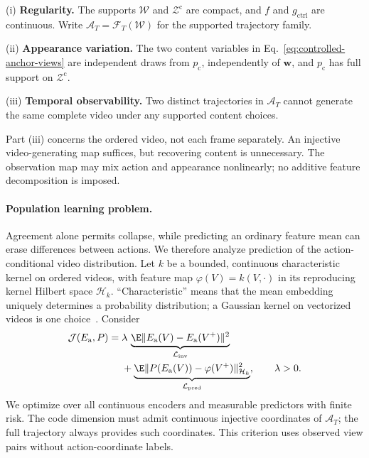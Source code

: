 \begin{condition}
\label{cond:anchor-identification}
\leavevmode

\par\noindent\textup{(i)} \textbf{Regularity.}
The supports $\mathcal W$ and $\mathcal Z^{\mathrm c}$ are compact, and
$f$ and $g_{\mathrm{ctrl}}$ are continuous. Write
$\mathcal A_T=\mathcal F_T(\mathcal W)$ for the supported trajectory family.

\par\noindent\textup{(ii)} \textbf{Appearance variation.}
The two content variables in Eq.~\ref{eq:controlled-anchor-views} are
independent draws from $p_{\mathrm c}$, independently of $\mathbf w$,
and $p_{\mathrm c}$ has full support on $\mathcal Z^{\mathrm c}$.

\par\noindent\textup{(iii)} \textbf{Temporal observability.}
Two distinct trajectories in $\mathcal A_T$ cannot generate the same
complete video under any supported content choices.
\end{condition}
Part (iii) concerns the ordered video, not each frame separately.
An injective video-generating map suffices, but recovering content is
unnecessary. The observation map may mix action and appearance nonlinearly;
no additive feature decomposition is imposed.

\paragraph{Population learning problem.}
Agreement alone permits collapse, while predicting an ordinary feature
mean can erase differences between actions. We therefore analyze prediction
of the action-conditional video distribution. Let $k$ be a bounded,
continuous characteristic kernel on ordered videos, with feature map
$\varphi(V)=k(V,\cdot)$ in its reproducing kernel Hilbert space $\mathcal H_k$.
``Characteristic'' means that the mean embedding uniquely determines a
probability distribution; a Gaussian kernel on vectorized videos is one
choice~\citep{sriperumbudur2010hilbert}. Consider
\begin{equation}
 \begin{aligned}
 \mathcal J(E_{\mathrm a},P)
 ={}&\lambda\,\underbrace{\E\|E_{\mathrm a}(V)-E_{\mathrm a}(V^+)\|^2}_{\mathcal L_{\mathrm{inv}}}\\
 &+\underbrace{\E\|P(E_{\mathrm a}(V))-\varphi(V^+)\|_{\mathcal H_k}^2}_{\mathcal L_{\mathrm{pred}}},
 \qquad\lambda>0 .
 \end{aligned}
 \label{eq:anchor-objective}
\end{equation}
We optimize over all continuous encoders and measurable predictors
with finite risk. The code dimension must admit continuous
injective coordinates of $\mathcal A_T$; the full trajectory always
provides such coordinates. This criterion uses observed view pairs
without action-coordinate labels.

